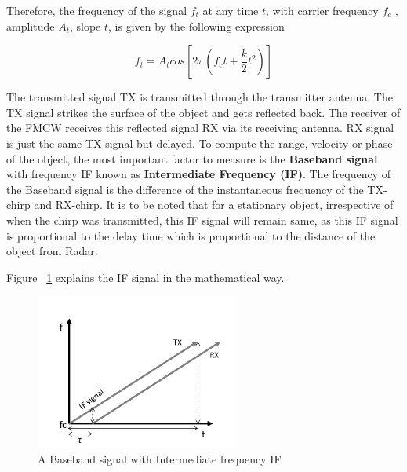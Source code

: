 Therefore, the frequency of the signal \(f_{t}\) at any time \(t\), with carrier frequency \(f_{c}\) , amplitude \(A_{t}\), slope \(t\), is given by the following expression

\[f_{t}= A_{t}cos[2\pi(f_{c}t + \frac{k}{2}t^2)]\]

The transmitted signal TX is transmitted through the transmitter antenna. The TX signal strikes the surface of the object and gets reflected back. The receiver of the FMCW receives this reflected signal RX via its receiving antenna. RX signal is just the same TX signal but delayed.
To compute the range, velocity or phase of the object, the most important factor to measure is the \textbf{Baseband signal} with frequency IF known as \textbf{Intermediate Frequency (IF)}. The frequency of the Baseband signal is the difference of the instantaneous frequency of the TX-chirp and RX-chirp. It is to be noted that for a stationary object, irrespective of when the  chirp was transmitted, this IF signal will remain same, as this IF signal is proportional to the delay time which is proportional to the distance of the object from Radar.

Figure ~\ref{fig:IF} explains the IF signal in the mathematical way. 
 \begin{figure}[ht]
  \begin{center}
    \includegraphics[width=0.60\textwidth]{Master's thesis/images/IFSignal.png} 
    \caption{A Baseband signal with Intermediate frequency IF}
    \label{fig:IF}
  \end{center}
\end{figure}   

